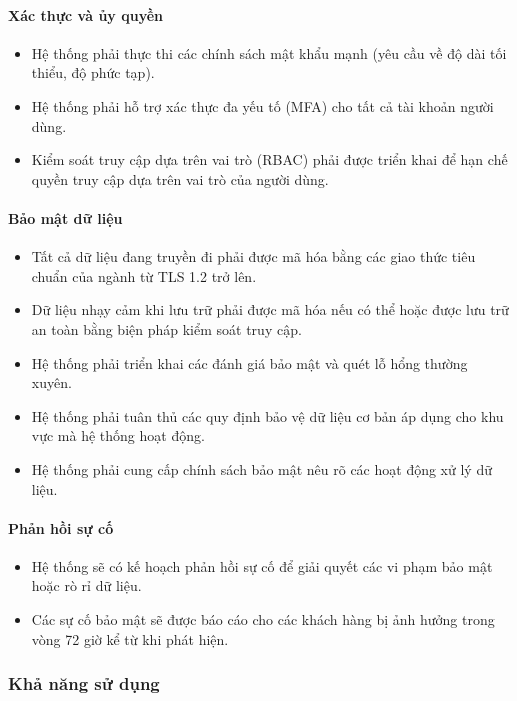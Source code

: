 \paragraph{Xác thực và ủy quyền}
\begin{itemize}
    \item Hệ thống phải thực thi các chính sách mật khẩu mạnh (yêu cầu về độ dài tối thiểu, độ phức tạp).
    \item Hệ thống phải hỗ trợ xác thực đa yếu tố (MFA) cho tất cả tài khoản người dùng.
    \item Kiểm soát truy cập dựa trên vai trò (RBAC) phải được triển khai để hạn chế quyền truy cập dựa trên vai trò của người dùng.
\end{itemize}

\paragraph{Bảo mật dữ liệu}
\begin{itemize}
    \item Tất cả dữ liệu đang truyền đi phải được mã hóa bằng các giao thức tiêu chuẩn của ngành từ TLS 1.2 trở lên.
    \item Dữ liệu nhạy cảm khi lưu trữ phải được mã hóa nếu có thể hoặc được lưu trữ an toàn bằng biện pháp kiểm soát truy cập.
    \item Hệ thống phải triển khai các đánh giá bảo mật và quét lỗ hổng thường xuyên.
    \item Hệ thống phải tuân thủ các quy định bảo vệ dữ liệu cơ bản áp dụng cho khu vực mà hệ thống hoạt động.
    \item Hệ thống phải cung cấp chính sách bảo mật nêu rõ các hoạt động xử lý dữ liệu.
\end{itemize}

\paragraph{Phản hồi sự cố}
\begin{itemize}
    \item Hệ thống sẽ có kế hoạch phản hồi sự cố để giải quyết các vi phạm bảo mật hoặc rò rỉ dữ liệu.
    \item Các sự cố bảo mật sẽ được báo cáo cho các khách hàng bị ảnh hưởng trong vòng 72 giờ kể từ khi phát hiện.
\end{itemize}

\subsubsection{Khả năng sử dụng}


